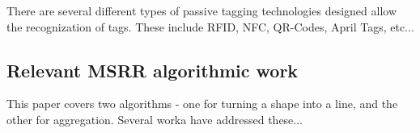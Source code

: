 There are several different types of passive tagging technologies designed allow the recognization of tags. These include RFID, NFC, QR-Codes, April Tags, etc...


\subsection{Relevant MSRR algorithmic work}
\label{sec:RW-Algorithmic}
This paper covers two algorithms - one for turning a shape into a line, and the other for aggregation.
Several worka have addressed these...